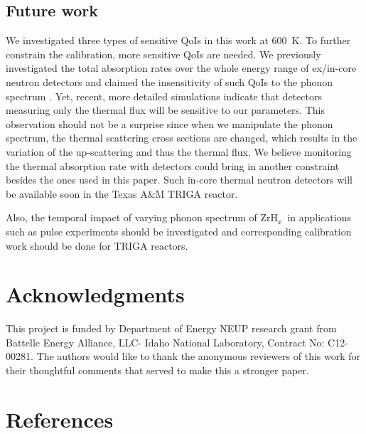 \documentclass[review]{elsarticle}
\newcommand{\zh}{ZrH$_x$}
\begin{document}
\subsection{Future work}
We investigated three types of sensitive QoIs in this work at 600~K. To further constrain the calibration, more sensitive QoIs are needed. We previously investigated the total absorption rates over the whole energy range of ex/in-core neutron detectors and claimed the insensitivity of such QoIs to the phonon spectrum \cite{physor}. Yet, recent, more detailed simulations indicate that detectors measuring only the thermal flux will be sensitive to our parameters. This observation should not be a surprise since when we manipulate the phonon spectrum, the thermal scattering cross sections are changed, which results in the variation of the up-scattering and thus the thermal flux\cite{thesis,weixiong}. We believe monitoring the thermal absorption rate with detectors could bring in another constraint besides the ones used in this paper. Such in-core thermal neutron detectors will be available soon in the Texas A\&M TRIGA reactor.


Also, the temporal impact of varying phonon spectrum of \zh~in applications such as pulse experiments should be investigated and corresponding calibration work should be done for TRIGA reactors.




\section*{Acknowledgments}
This project is funded by Department of Energy NEUP research grant from Battelle Energy Alliance, LLC- Idaho National Laboratory, Contract No: C12-00281. The authors would like to thank the anonymous reviewers of this work for their thoughtful comments that served to make this a stronger paper.
\section*{References}


\end{document}
